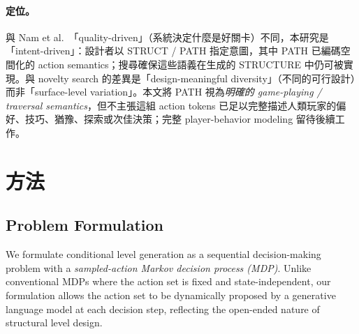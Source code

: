 \documentclass[11pt,a4paper]{article}
\begin{document}
\paragraph{定位。}與 Nam et al.~\cite{nam2024}「quality-driven」（系統決定什麼是好關卡）不同，本研究是「intent-driven」：設計者以 STRUCT / PATH 指定意圖，其中 PATH 已編碼空間化的 action semantics；搜尋確保這些語義在生成的 STRUCTURE 中仍可被實現。與 novelty search 的差異是「design-meaningful diversity」（不同的可行設計）而非「surface-level variation」。本文將 PATH 視為\emph{明確的 game-playing / traversal semantics}，但不主張這組 action tokens 已足以完整描述人類玩家的偏好、技巧、猶豫、探索或次佳決策；完整 player-behavior modeling 留待後續工作。

\section{方法}

\subsection{Problem Formulation}

We formulate conditional level generation as a sequential decision-making problem with a \emph{sampled-action Markov decision process (MDP)}. Unlike conventional MDPs where the action set is fixed and state-independent, our formulation allows the action set to be dynamically proposed by a generative language model at each decision step, reflecting the open-ended nature of structural level design.
\end{document}
